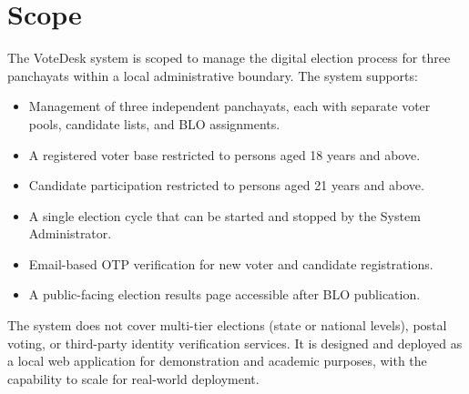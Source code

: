 \section{Scope}

The VoteDesk system is scoped to manage the digital election process for three panchayats within a local administrative boundary. The system supports:

\begin{itemize}
    \item Management of three independent panchayats, each with separate voter pools, candidate lists, and BLO assignments.
    \item A registered voter base restricted to persons aged 18 years and above.
    \item Candidate participation restricted to persons aged 21 years and above.
    \item A single election cycle that can be started and stopped by the System Administrator.
    \item Email-based OTP verification for new voter and candidate registrations.
    \item A public-facing election results page accessible after BLO publication.
\end{itemize}

The system does not cover multi-tier elections (state or national levels), postal voting, or third-party identity verification services. It is designed and deployed as a local web application for demonstration and academic purposes, with the capability to scale for real-world deployment.
